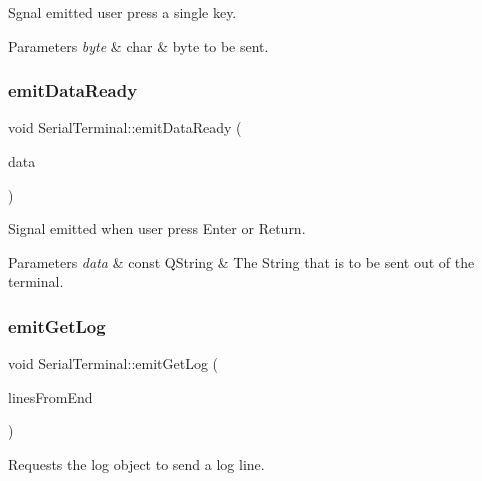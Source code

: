 Sgnal emitted user press a single key. 


\begin{DoxyParams}{Parameters}
{\em byte} & char \& byte to be sent. \\
\hline
\end{DoxyParams}
\mbox{\label{classSerialTerminal_a53f49282e28fb496fc77fcd8362e1298}} 
\subsubsection{\texorpdfstring{emit\+Data\+Ready}{emitDataReady}}
{\footnotesize\ttfamily void Serial\+Terminal\+::emit\+Data\+Ready (\begin{DoxyParamCaption}\item[{const Q\+String \&}]{data }\end{DoxyParamCaption})\hspace{0.3cm}{\ttfamily [signal]}}



Signal emitted when user press Enter or Return. 


\begin{DoxyParams}{Parameters}
{\em data} & const Q\+String \& The String that is to be sent out of the terminal. \\
\hline
\end{DoxyParams}
\mbox{\label{classSerialTerminal_a2676d7377ffa113b1f3431cdf1cde904}} 
\subsubsection{\texorpdfstring{emit\+Get\+Log}{emitGetLog}}
{\footnotesize\ttfamily void Serial\+Terminal\+::emit\+Get\+Log (\begin{DoxyParamCaption}\item[{const int \&}]{lines\+From\+End }\end{DoxyParamCaption})\hspace{0.3cm}{\ttfamily [signal]}}



Requests the log object to send a log line. 


